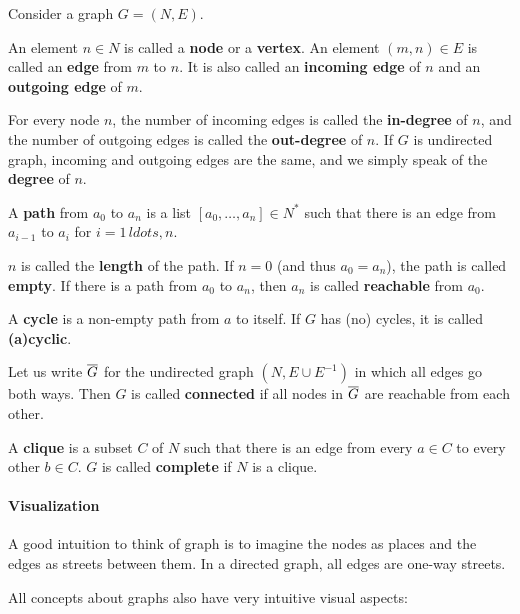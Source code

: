 \begin{definition}
Consider a graph $G=(N,E)$.

An element $n\in N$ is called a \textbf{node} or a \textbf{vertex}.
An element $(m,n)\in E$ is called an \textbf{edge} from $m$ to $n$.
It is also called an \textbf{incoming edge} of $n$ and an \textbf{outgoing edge} of $m$.

For every node $n$, the number of incoming edges is called the \textbf{in-degree} of $n$, and the number of outgoing edges is called the \textbf{out-degree} of $n$.
If $G$ is undirected graph, incoming and outgoing edges are the same, and we simply speak of the \textbf{degree} of $n$.

A \textbf{path} from $a_0$ to $a_n$ is a list $[a_0,\ldots,a_n]\in N^*$ such that there is an edge from $a_{i-1}$ to $a_i$ for $i=1\,ldots,n$.

$n$ is called the \textbf{length} of the path.
If $n=0$ (and thus $a_0=a_n$), the path is called \textbf{empty}.
If there is a path from $a_0$ to $a_n$, then $a_n$ is called \textbf{reachable} from $a_0$.

A \textbf{cycle} is a non-empty path from $a$ to itself.
If $G$ has (no) cycles, it is called \textbf{(a)cyclic}.

Let us write $\overline{G}$ for the undirected graph $(N, E\cup E^{-1})$ in which all edges go both ways.
Then $G$ is called \textbf{connected} if all nodes in $\overline{G}$ are reachable from each other.

A \textbf{clique} is a subset $C$ of $N$ such that there is an edge from every $a\in C$ to every other $b\in C$.
$G$ is called \textbf{complete} if $N$ is a clique.
\end{definition}


\paragraph{Visualization}
A good intuition to think of graph is to imagine the nodes as places and the edges as streets between them.
In a directed graph, all edges are one-way streets.

All concepts about graphs also have very intuitive visual aspects:

